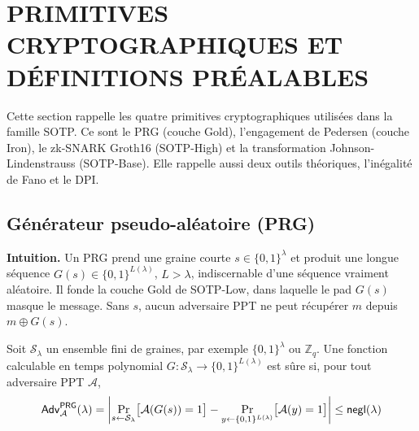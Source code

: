 \section{PRIMITIVES CRYPTOGRAPHIQUES ET D\'EFINITIONS PR\'EALABLES}
\label{sec:gamebased_primitives}
\begin{sloppypar}

Cette section rappelle les quatre primitives cryptographiques utilis\'ees dans la
famille SOTP. Ce sont le PRG (couche Gold), l'engagement de Pedersen (couche Iron),
le zk-SNARK Groth16 (SOTP-High) et la transformation Johnson-Lindenstrauss
(SOTP-Base). Elle rappelle aussi deux outils th\'eoriques, l'in\'egalit\'e de Fano et le DPI.

\subsection{G\'en\'erateur pseudo-al\'eatoire (PRG)}
\noindent\textbf{Intuition.} Un PRG prend une graine courte
$s \in \{0,1\}^\lambda$ et produit une longue s\'equence
$G(s) \in \{0,1\}^{L(\lambda)}$, $L > \lambda$, indiscernable
d'une s\'equence vraiment al\'eatoire. Il fonde la couche
Gold de SOTP-Low, dans laquelle le pad $G(s)$ masque le message. Sans $s$,
aucun adversaire PPT ne peut r\'ecup\'erer $m$ depuis $m \oplus G(s)$.

\begin{definition}\label{def:ann_prg}
Soit $\mathcal{S}_\lambda$ un ensemble fini de graines, par exemple
$\{0,1\}^\lambda$ ou $\mathbb{Z}_q$.
Une fonction calculable en temps polynomial
$G\colon \mathcal{S}_\lambda \to \{0,1\}^{L(\lambda)}$
est sûre si, pour tout adversaire PPT $\mathcal{A}$, 
\begin{equation}
\mathsf{Adv}^{\mathsf{PRG}}_{\mathcal{A}}(\lambda) =
\left|
\Pr_{s \leftarrow \mathcal{S}_\lambda}\!\big[\mathcal{A}(G(s)) = 1\big]
- \Pr_{y \leftarrow \{0,1\}^{L(\lambda)}}\!\big[\mathcal{A}(y) = 1\big]
\right| \leq \mathsf{negl}(\lambda)
\end{equation}
\end{definition}


\end{sloppypar}

